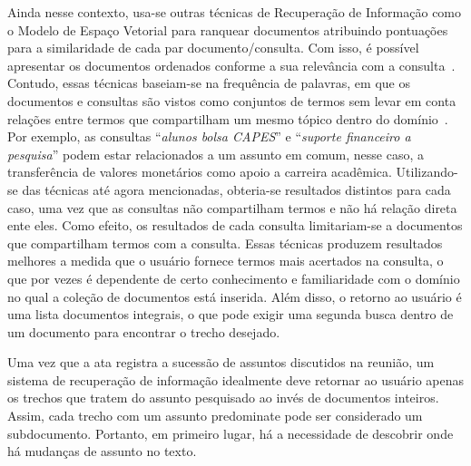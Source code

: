 Ainda nesse contexto, usa-se outras técnicas de Recuperação de Informação como o Modelo de Espaço Vetorial para ranquear documentos atribuindo pontuações para a similaridade de cada par documento/consulta. Com isso, é possível apresentar os documentos ordenados conforme a sua relevância com a consulta~\cite{Gutierrez2016, Croft2009, Manning2008}. 
%
Contudo, essas técnicas baseiam-se na frequência de palavras, em que os documentos e consultas são vistos como conjuntos de termos sem levar em conta relações entre termos que compartilham um mesmo tópico dentro do domínio~\cite{WEIXING}. Por exemplo, as consultas ``\textit{alunos bolsa CAPES}'' e ``\textit{suporte financeiro a pesquisa}'' podem estar relacionados a um assunto em comum,
nesse caso, a transferência de valores monetários como apoio a carreira acadêmica.
Utilizando-se das técnicas até agora mencionadas, obteria-se resultados distintos para cada caso, uma vez que as consultas não compartilham termos e não há relação direta ente eles. Como efeito, os resultados de cada consulta limitariam-se a documentos que compartilham termos com a consulta.
Essas técnicas produzem resultados melhores a medida que o usuário fornece termos mais acertados na consulta, o que por vezes é dependente de certo conhecimento e familiaridade com o domínio no qual a coleção de documentos está inserida. 
% 
Além disso, o retorno ao usuário é uma lista documentos integrais, o que pode exigir uma segunda busca dentro de um documento para encontrar o trecho desejado.





% 
% 
Uma vez que a ata registra a sucessão de assuntos discutidos na reunião, um sistema de recuperação de informação idealmente deve retornar ao usuário apenas os trechos que tratem do assunto pesquisado ao invés de documentos inteiros. Assim, cada trecho com um assunto predominate pode ser considerado um subdocumento. Portanto, em primeiro lugar, há a necessidade de descobrir onde há mudanças de assunto no texto. 


